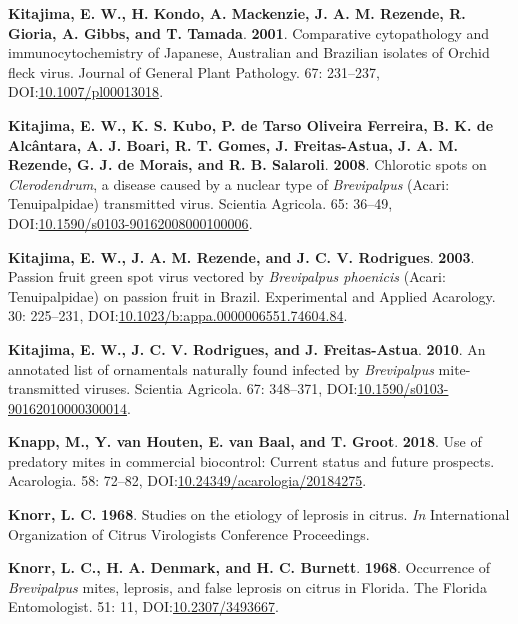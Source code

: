 \documentclass[12pt,final,CPage]{ufthesis}
\newlength{\cslhangindent}
\newenvironment{CSLReferences}[2] %
{%
	\setlength{\parindent}{0pt}
	\ifodd #1 \everypar{\setlength{\hangindent}{\cslhangindent}}\ignorespaces\fi
	\ifnum #2 > 0
	\setlength{\parskip}{#2\baselineskip}
	\fi
}%
{}
\begin{document}
{\begin{CSLReferences}{1}{0}
  \leavevmode{}%
  \textbf{Kitajima, E. W., H. Kondo, A. Mackenzie, J. A. M. Rezende, R. Gioria, A. Gibbs, and T. Tamada}. \textbf{2001}. Comparative cytopathology and immunocytochemistry of {Japanese}, {Australian} and {Brazilian} isolates of {Orchid fleck virus}. Journal of General Plant Pathology. 67: 231--237, DOI:\href{https://doi.org/10.1007/pl00013018}{10.1007/pl00013018}.

  \leavevmode{}%
  \textbf{Kitajima, E. W., K. S. Kubo, P. de Tarso Oliveira Ferreira, B. K. de Alcântara, A. J. Boari, R. T. Gomes, J. Freitas-Astua, J. A. M. Rezende, G. J. de Morais, and R. B. Salaroli}. \textbf{2008}. Chlorotic spots on {\emph{Clerodendrum}}, a disease caused by a nuclear type of {\emph{Brevipalpus}} ({Acari}: {Tenuipalpidae}) transmitted virus. Scientia Agricola. 65: 36--49, DOI:\href{https://doi.org/10.1590/s0103-90162008000100006}{10.1590/s0103-90162008000100006}.

  \leavevmode{}%
  \textbf{Kitajima, E. W., J. A. M. Rezende, and J. C. V. Rodrigues}. \textbf{2003}. {Passion fruit green spot virus} vectored by {\emph{Brevipalpus phoenicis}} ({Acari}: {Tenuipalpidae}) on passion fruit in {Brazil}. Experimental and Applied Acarology. 30: 225--231, DOI:\href{https://doi.org/10.1023/b:appa.0000006551.74604.84}{10.1023/b:appa.0000006551.74604.84}.

  \leavevmode{}%
  \textbf{Kitajima, E. W., J. C. V. Rodrigues, and J. Freitas-Astua}. \textbf{2010}. An annotated list of ornamentals naturally found infected by {\emph{Brevipalpus}} mite-transmitted viruses. Scientia Agricola. 67: 348--371, DOI:\href{https://doi.org/10.1590/s0103-90162010000300014}{10.1590/s0103-90162010000300014}.

  \leavevmode{}%
  \textbf{Knapp, M., Y. van Houten, E. van Baal, and T. Groot}. \textbf{2018}. Use of predatory mites in commercial biocontrol: Current status and future prospects. Acarologia. 58: 72--82, DOI:\href{https://doi.org/10.24349/acarologia/20184275}{10.24349/acarologia/20184275}.

  \leavevmode{}%
  \textbf{Knorr, L. C.} \textbf{1968}. Studies on the etiology of leprosis in citrus. \emph{In} International Organization of Citrus Virologists Conference Proceedings.

  \leavevmode{}%
  \textbf{Knorr, L. C., H. A. Denmark, and H. C. Burnett}. \textbf{1968}. Occurrence of {\emph{Brevipalpus}} mites, leprosis, and false leprosis on citrus in {Florida}. The Florida Entomologist. 51: 11, DOI:\href{https://doi.org/10.2307/3493667}{10.2307/3493667}.


\end{CSLReferences}}
\end{document}
